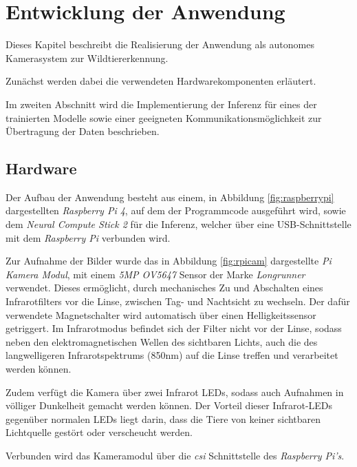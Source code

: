 
\chapter{Entwicklung der Anwendung}\label{kap:application}


Dieses Kapitel beschreibt die Realisierung der
Anwendung als autonomes Kamerasystem zur
Wildtiererkennung.

Zunächst werden dabei die verwendeten Hardwarekomponenten 
erläutert.

Im zweiten Abschnitt wird die Implementierung der 
Inferenz für eines der trainierten Modelle 
sowie einer geeigneten Kommunikationsmöglichkeit 
zur Übertragung der Daten beschrieben.


\section{Hardware}\label{sec:aufbau}


Der Aufbau der Anwendung besteht aus einem, in Abbildung 
\ref{fig:raspberrypi} dargestellten \textit{Raspberry Pi 4},
auf dem der Programmcode ausgeführt wird,
sowie dem \textit{Neural Compute Stick 2}
 für die Inferenz, welcher über eine USB-Schnittstelle
mit dem \textit{Raspberry Pi} verbunden wird.

Zur Aufnahme der Bilder wurde das in 
Abbildung \ref{fig:rpicam} dargestellte 
\textit{Pi Kamera Modul},
mit einem \textit{5MP OV5647} Sensor der Marke \textit{Longrunner}
verwendet.
Dieses ermöglicht, durch mechanisches Zu und Abschalten
eines Infrarotfilters vor die Linse, zwischen Tag- und
Nachtsicht zu wechseln.
Der dafür verwendete Magnetschalter wird automatisch 
über einen Helligkeitssensor getriggert.
Im Infrarotmodus befindet sich der Filter nicht 
vor der Linse, sodass neben den elektromagnetischen 
Wellen des sichtbaren Lichts, auch die des 
langwelligeren Infrarotspektrums (850nm) 
auf die Linse treffen und verarbeitet werden können.

Zudem verfügt die Kamera über zwei Infrarot LEDs, 
sodass auch Aufnahmen in völliger Dunkelheit gemacht werden
können.
Der Vorteil dieser Infrarot-LEDs gegenüber normalen
LEDs liegt darin, 
dass die Tiere von keiner sichtbaren Lichtquelle 
gestört oder verscheucht werden.

Verbunden wird das Kameramodul über die \textit{\Gls{csi}}
Schnittstelle des \textit{Raspberry Pi's}.


